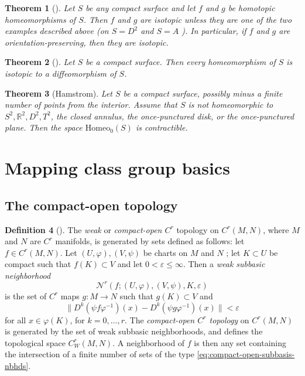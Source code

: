 \documentclass[reqno]{amsart}
\newtheorem{theorem}{Theorem}[section]
\theoremstyle{definition}
\newtheorem{definition}[theorem]{Definition}
\theoremstyle{remark}
\newcommand{\Homeo}{{\mathrm{Homeo}}}
\begin{document}
\begin{theorem}[]
    Let $S$ be any compact surface and let $f$ and $g$ be
    homotopic homeomorphisms of $S$. Then $f$ and $g$ are
    isotopic unless they are one of the two examples described
    above (on $S = D^2$ and $S = A$ ). In particular,
    if $f$ and $g$ are orientation-preserving, then they
    are isotopic.
\end{theorem}



\begin{theorem}[]
    Let $S$ be a compact surface. Then every homeomorphism of
    $S$ is isotopic to a diffeomorphism of $S$.
\end{theorem}

\begin{theorem}[Hamstrom]
    Let $S$ be a compact surface, possibly minus a finite
    number of points from the interior. Assume that
    $S$ is not homeomorphic to
    $S^2, \mathbb{R}^2, D^2, T^2$, the closed annulus,
    the once-punctured disk, or the once-punctured plane. Then
    the space $\Homeo_0 (S)$ is contractible.
\end{theorem}




\newpage

\section{Mapping class group basics}


\subsection*{The compact-open topology}

\begin{definition}[]
    The \textit{weak} or \textit{compact-open $C^{r}$ }
    topology on $C^{r} \left( M,N \right) $, where
    $M$ and $N$ are $C^{r}$ manifolds, is generated
    by sets defined as follows:
    let $f \in C^{r}(M,N)$. Let $\left( U, \varphi \right),
    \left( V, \psi  \right) $ be charts on
    $M$ and $N$ ; let $K \subset U$ be compact such that
    $f(K) \subset V$ and let $0 < \varepsilon \le 
    \infty $. Then a \textit{weak subbasic neighborhood}
    \[
    \mathcal{N}^{r} \left( f ; \left( U, \varphi  \right) ,
    \left( V, \psi  \right) , K, \varepsilon \right) 
    \tag{$\zeta$}\label{eq:compact-open-subbasis-nbhds}
    \] 
    is the set of $C^{r}$ maps $g \colon M \to N$ such that
    $g(K) \subset V$ and
    \[
    \|D^{k}\left( \psi f \varphi^{-1} \right) (x)
    -D^{k} \left( \psi g \varphi^{-1} \right) (x)\|< \varepsilon
    \] 
    for all $x \in \varphi(K)$, for $k = 0, \ldots, r$.
    The \textit{compact-open $C^{r}$ topology} on
    $C^{r}(M,N)$ is generated by the set of weak subbasic
    neighborhoods, and defines the topological space
    $C_W^{r} (M,N)$.
    A neighborhood of $f$ is then
    any set containing the intersection
    of a finite number of sets of the
    type \eqref{eq:compact-open-subbasis-nbhds}.
\end{definition}
\end{document}
